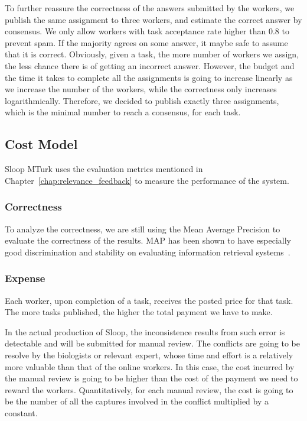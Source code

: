 To further reassure the correctness of the answers submitted by the workers, we
publish the same assignment to three workers, and estimate the correct answer
by consensus. We only allow workers with task acceptance rate higher than 0.8
to prevent spam. If the majority agrees on some answer, it maybe safe to assume
that it is correct. Obviously, given a task, the more number of workers we
assign, the less chance there is of getting an incorrect answer. However, the
budget and the time it takes to complete all the assignments is going to
increase linearly as we increase the number of the workers, while the
correctness only increases logarithmically. Therefore, we decided to publish
exactly three assignments, which is the minimal number to reach a consensus,
for each task.

\subsection{Cost Model}

Sloop MTurk uses the evaluation metrics mentioned in
Chapter~\ref{chap:relevance_feedback} to measure the performance of the system.

\subsubsection{Correctness}

To analyze the correctness, we are still using the Mean Average Precision to
evaluate the correctness of the results. MAP has been shown to have especially
good discrimination and stability on evaluating information retrieval
systems~\cite{manning2008introduction}.

\subsubsection{Expense}

Each worker, upon completion of a task, receives the posted price for that
task. The more tasks published, the higher the total payment we have to make.

In the actual production of Sloop, the inconsistence results from such error is
detectable and will be submitted for manual review. The conflicts are going to
be resolve by the biologists or relevant expert, whose time and effort is a
relatively more valuable than that of the online workers. In this case, the
cost incurred by the manual review is going to be higher than the cost of the
payment we need to reward the workers. Quantitatively, for each manual review,
the cost is going to be the number of all the captures involved in the conflict
multiplied by a constant.
